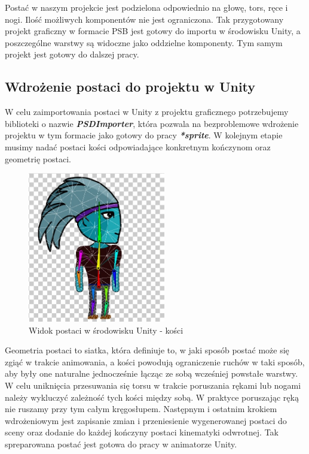 \documentclass[oneside,polski,logo]{amuthesis}
\begin{document}
Postać w naszym projekcie jest podzielona odpowiednio na głowę, tors, ręce i nogi. Ilość możliwych komponentów nie jest ograniczona. Tak przygotowany projekt graficzny w formacie PSB jest gotowy do importu w środowisku Unity, a poszczególne warstwy są widoczne jako oddzielne komponenty. Tym samym projekt jest gotowy do dalszej pracy.
\subsection{Wdrożenie postaci do projektu w Unity}
W celu zaimportowania postaci w Unity z projektu graficznego potrzebujemy biblioteki o nazwie \textbf{\textit{PSDImporter}}, która pozwala na bezproblemowe wdrożenie projektu w tym formacie jako gotowy do pracy \textbf{\textit{*sprite}}. W kolejnym etapie musimy nadać postaci kości odpowiadające konkretnym kończynom oraz geometrię postaci.

\begin{figure}[h]
	\centering
	\includegraphics[width=6cm]{images/kozubal/bones.jpg}
	\caption{Widok postaci w środowisku Unity - kości}
\end{figure}

Geometria postaci to siatka, która definiuje to, w jaki sposób postać może się zgiąć w trakcie animowania, a kości powodują ograniczenie ruchów w taki sposób, aby były one naturalne jednocześnie łącząc ze sobą wcześniej powstałe warstwy. W celu uniknięcia przesuwania się torsu w trakcie poruszania rękami lub nogami należy wykluczyć zależność tych kości między sobą. W praktyce poruszając ręką nie ruszamy przy tym całym kręgosłupem.
Następnym i ostatnim krokiem wdrożeniowym jest zapisanie zmian i przeniesienie wygenerowanej postaci do sceny oraz dodanie do każdej kończyny postaci kinematyki odwrotnej. Tak spreparowana postać jest gotowa do pracy w animatorze Unity.
\end{document}
